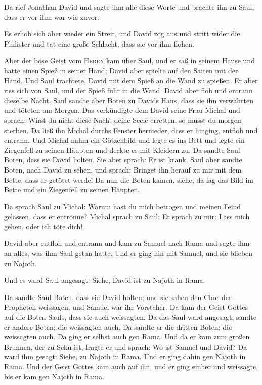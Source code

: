  Da rief Jonathan David und sagte ihm alle diese Worte und
brachte ihn zu Saul, dass er vor ihm war wie zuvor.

 Es erhob sich aber wieder ein Streit, und David zog aus
und stritt wider die Philister und tat eine große Schlacht, dass sie vor
ihm flohen.

 Aber der böse Geist vom \textsc{Herrn} kam über Saul, und
er saß in seinem Hause und hatte einen Spieß in seiner Hand; David aber
spielte auf den Saiten mit der Hand.  Und Saul trachtete,
David mit dem Spieß an die Wand zu spießen. Er aber riss sich von Saul,
und der Spieß fuhr in die Wand. David aber floh und entrann dieselbe
Nacht.  Saul sandte aber Boten zu Davids Haus, dass sie
ihn verwahrten und töteten am Morgen. Das verkündigte dem David seine
Frau Michal und sprach: Wirst du nicht diese Nacht deine Seele erretten,
so musst du morgen sterben.  Da ließ ihn Michal durchs
Fenster hernieder, dass er hinging, entfloh und entrann. 
Und Michal nahm ein Götzenbild und legte es ins Bett und legte ein
Ziegenfell zu seinen Häupten und deckte es mit Kleidern zu.
 Da sandte Saul Boten, dass sie David holten. Sie aber
sprach: Er ist krank.  Saul aber sandte Boten, nach David
zu sehen, und sprach: Bringet ihn herauf zu mir mit dem Bette, dass er
getötet werde!  Da nun die Boten kamen, siehe, da lag das
Bild im Bette und ein Ziegenfell zu seinen Häupten.

 Da sprach Saul zu Michal: Warum hast du mich betrogen
und meinen Feind gelassen, dass er entrönne? Michal sprach zu Saul: Er
sprach zu mir: Lass mich gehen, oder ich töte dich!

 David aber entfloh und entrann und kam zu Samuel nach
Rama und sagte ihm an alles, was ihm Saul getan hatte. Und er ging hin
mit Samuel, und sie blieben zu Najoth.

 Und es ward Saul angesagt: Siehe, David ist zu Najoth in
Rama.

 Da sandte Saul Boten, dass sie David holten; und sie
sahen den Chor der Propheten weissagen, und Samuel war ihr Vorsteher. Da
kam der Geist Gottes auf die Boten Sauls, dass sie auch weissagten.
 Da das Saul ward angesagt, sandte er andere Boten; die
weissagten auch. Da sandte er die dritten Boten; die weissagten auch.
 Da ging er selbst auch gen Rama. Und da er kam zum
großen Brunnen, der zu Seku ist, fragte er und sprach: Wo ist Samuel und
David? Da ward ihm gesagt: Siehe, zu Najoth in Rama.  Und
er ging dahin gen Najoth in Rama. Und der Geist Gottes kam auch auf ihn,
und er ging einher und weissagte, bis er kam gen Najoth in Rama.

